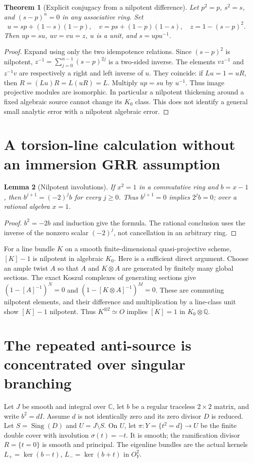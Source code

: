 \documentclass[11pt]{article}
\newtheorem{theorem}{Theorem}[section]
\newtheorem{lemma}[theorem]{Lemma}
\begin{document}
\begin{theorem}[Explicit conjugacy from a nilpotent difference]
Let $p^2=p$, $s^2=s$, and $(s-p)^n=0$ in any associative ring. Set
\[
 u=sp+(1-s)(1-p),\quad v=ps+(1-p)(1-s),\quad z=1-(s-p)^2.
\]
Then $up=su$, $uv=vu=z$, $u$ is a unit, and $s=upu^{-1}$.
\end{theorem}
\begin{proof}
Expand using only the two idempotence relations. Since $(s-p)^2$ is
nilpotent, $z^{-1}=\sum_{j=0}^{n-1}(s-p)^{2j}$ is a two-sided inverse.
The elements $vz^{-1}$ and $z^{-1}v$ are respectively a right and left inverse
of $u$. They coincide: if $Lu=1=uR$, then $R=(Lu)R=L(uR)=L$.
Multiply $up=su$ by $u^{-1}$. Thus image projective modules are isomorphic.
In particular a nilpotent thickening around a fixed algebraic source cannot
change its $K_0$ class. This does not identify a general small analytic error
with a nilpotent algebraic error.
\end{proof}

\section{A torsion-line calculation without an immersion GRR assumption}
\begin{lemma}[Nilpotent involutions]
If $x^2=1$ in a commutative ring and $b=x-1$, then
$b^{j+1}=(-2)^j b$ for every $j\ge0$. Thus $b^{j+1}=0$ implies
$2^j b=0$; over a rational algebra $x=1$.
\end{lemma}
\begin{proof}
$b^2=-2b$ and induction give the formula. The rational conclusion uses the
inverse of the nonzero scalar $(-2)^j$, not cancellation in an arbitrary ring.
\end{proof}
For a line bundle $K$ on a smooth finite-dimensional quasi-projective scheme,
$[K]-1$ is nilpotent in algebraic $K_0$. Here is a sufficient direct argument.
Choose an ample twist $A$ so that $A$ and $K\otimes A$ are generated by finitely
many global sections. The exact Koszul complexes of generating sections give
$(1-[A]^{-1})^N=0$ and $(1-[K\otimes A]^{-1})^M=0$. These are commuting
nilpotent elements, and their difference and multiplication by a line-class
unit show $[K]-1$ nilpotent. Thus $K^{\otimes2}\simeq O$ implies
$[K]=1$ in $K_0\otimes\mathbb Q$.

\section{The repeated anti-source is concentrated over singular branching}
Let $J$ be smooth and integral over $\mathbb C$, let $b$ be a regular traceless $2\times2$
matrix, and write $b^2=dI$. Assume $d$ is not identically zero and its zero
divisor $D$ is reduced. Let $S=\operatorname{Sing}(D)$ and $U=J\setminus S$.
On $U$, let $\pi:Y=\{t^2=d\}\to U$ be the finite double cover with involution
$\sigma(t)=-t$. It is smooth; the ramification divisor $R=\{t=0\}$ is smooth
and principal. The eigenline bundles are the actual kernels
$L_+=\ker(b-t)$, $L_-=\ker(b+t)$ in $O_Y^2$.
\end{document}
